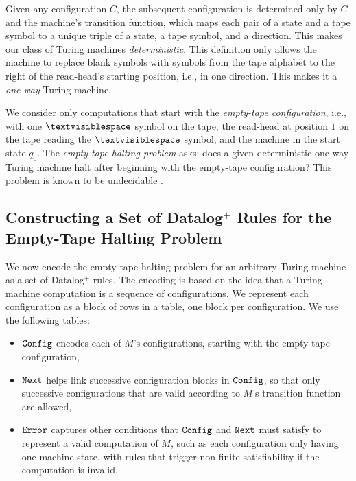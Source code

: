 Given any configuration $C$,
the subsequent configuration is determined only
by $C$ and the machine's transition function,
which maps each pair of a state and a tape symbol
to a unique triple of a state, a tape symbol, and a direction.
This makes our class of Turing machines {\it deterministic}. 
This definition only allows the machine to replace blank symbols
with symbols from the tape alphabet to the right of the read-head's starting position,
i.e., in one direction.
This makes it a {\it one-way} Turing machine.

We consider only computations that start with
the {\it empty-tape configuration},
i.e., with one $\blank$ symbol on the tape,
the read-head at position $1$ on the tape reading the $\blank$ symbol,
and the machine in the start state $q_0$.
The {\it empty-tape halting problem} asks:
does a given deterministic one-way Turing machine
halt after beginning with the empty-tape configuration?
This problem is known to be undecidable \cite{banitt2010halting}.

\subsection{Constructing a Set of Datalog$^{+}$ Rules for the Empty-Tape Halting Problem}
\label{subsection:finite-satisfiability-encoding}

We now encode the empty-tape halting problem
for an arbitrary Turing machine
as a set of Datalog$^{+}$ rules.
The encoding is based on the idea
that a Turing machine computation is a sequence of configurations.
We represent each configuration as a block of rows in a table,
one block per configuration.
We use the following tables:
\begin{itemize}
    \item $\texttt{Config}$ encodes each of $M$'s configurations,
    starting with the empty-tape configuration,
    \item $\texttt{Next}$ helps link successive configuration blocks 
    in $\texttt{Config}$, so that only successive configurations
    that are valid according to $M$'s transition function
    are allowed,
    \item $\texttt{\tt Error}$ captures other conditions
    that $\texttt{Config}$ and $\texttt{Next}$ must satisfy
    to represent a valid computation of $M$,
    such as each configuration only having one machine state,
    with rules that trigger non-finite satisfiability
    if the computation is invalid.
\end{itemize}

